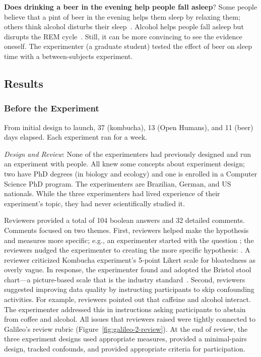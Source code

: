 \textbf{Does drinking a beer in the evening help people fall asleep}? Some people believe that a pint of beer in the evening helps them sleep by relaxing them; others think alcohol disturbs their sleep~\cite{Ph.D.}. Alcohol helps people fall asleep but disrupts the REM cycle~\cite{Ebrahim2013}. Still, it can be more convincing to see the evidence oneself. The experimenter (a graduate student) tested the effect of beer on sleep time with a between-subjects experiment. 

\subsection*{Results}
\subsubsection{Before the Experiment}
From initial design to launch, 37 (kombucha), 13 (Open Humans), and 11 (beer) days elapsed. Each experiment ran for a week.

\textit{Design and Review}: None of the experimenters had previously designed and run an experiment with people. All knew some concepts about experiment design; two have PhD degrees (in biology and ecology) and one is enrolled in a Computer Science PhD program. The experimenters are Brazilian, German, and US nationals. While the three experimenters had lived experience of their experiment's topic, they had never scientifically studied it.

Reviewers provided a total of 104 boolean answers and 32 detailed comments. Comments focused on two themes. First, reviewers helped make the hypothesis and measures more specific; e.g., an experimenter started with the question \textit{}; the reviewers nudged the experimenter to creating the more specific hypothesis: \textit{}. A reviewer criticized Kombucha experiment's 5-point Likert scale for bloatedness as overly vague. In response, the experimenter found and adopted the Bristol stool chart---a picture-based scale that is the industry standard~\cite{Wikipedia2018}. Second, reviewers suggested improving data quality by instructing participants to skip confounding activities. For example, reviewers pointed out that caffeine and alcohol interact. The experimenter addressed this in instructions asking participants to abstain from coffee and alcohol. All issues that reviewers raised were tightly connected to Galileo's review rubric (Figure~\ref{fig:galileo-2-review}). At the end of review, the three experiment designs used appropriate measures, provided a minimal-pairs design, tracked confounds, and provided appropriate criteria for participation.

